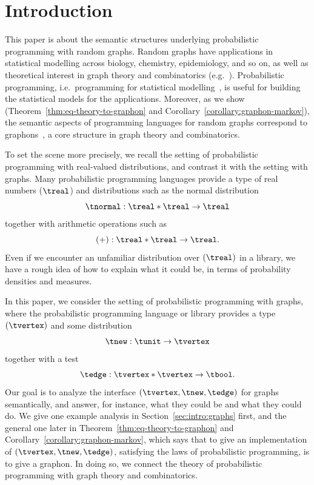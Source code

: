 \section{Introduction}
\label{sec:intro}

This paper is about the semantic structures underlying probabilistic
programming with random graphs. Random graphs have applications in
statistical modelling across biology, chemistry, epidemiology, and so
on, as well as theoretical interest in graph theory and combinatorics (e.g.~\cite{graphs-handbook}). Probabilistic programming, i.e.~programming for statistical
modelling~\cite{probprog-intro}, is useful for building the statistical
models for the applications. Moreover, as we show
(Theorem~\ref{thm:eq-theory-to-graphon} and Corollary~\ref{corollary:graphon-markov}),
the semantic aspects of programming languages for random graphs
correspond to graphons~\cite{MR3012035}, a core structure in graph
theory and combinatorics. 


To set the scene more precisely, we recall the setting of
probabilistic programming with real-valued distributions, 
and contrast it with the setting with graphs.
Many probabilistic programming languages provide a type of
real numbers ($\treal$) and distributions such as the normal
distribution
\begin{equation}\label{eqn:tnormal}
  \tnormal :\treal\ast\treal\to \treal
\end{equation}
together with arithmetic operations such as
\begin{equation}\label{eqn:add}
  (+) :\treal\ast\treal\to \treal\text.
\end{equation}
Even if we encounter an unfamiliar distribution over $(\treal)$ in a library, we have
a rough idea of how to explain what it could be, in terms of probability
densities and measures.

In this paper, we consider the setting of probabilistic programming with graphs, where
the probabilistic programming language or library provides a type $(\tvertex)$ and some distribution 
\begin{equation}\label{eqn:intro-new}
  \tnew : \tunit \to \tvertex
\end{equation}
together with a test
\begin{equation}\label{eqn:intro-edge}
  \tedge:\tvertex\ast\tvertex\to \tbool\text.
\end{equation}
Our goal is to analyze the interface $(\tvertex,\tnew,\tedge)$ for graphs semantically,
and answer, for instance, what they could be and what they could do. We give one example analysis in Section~\ref{sec:intro:graphs} first, and the general one later in Theorem~\ref{thm:eq-theory-to-graphon} and Corollary~\ref{corollary:graphon-markov}, which says that to give an implementation of
$(\tvertex,\tnew,\tedge)$, satisfying the laws of probabilistic
programming, is to give a graphon. In doing so, we connect 
the theory of probabilistic programming with graph theory and
combinatorics.


